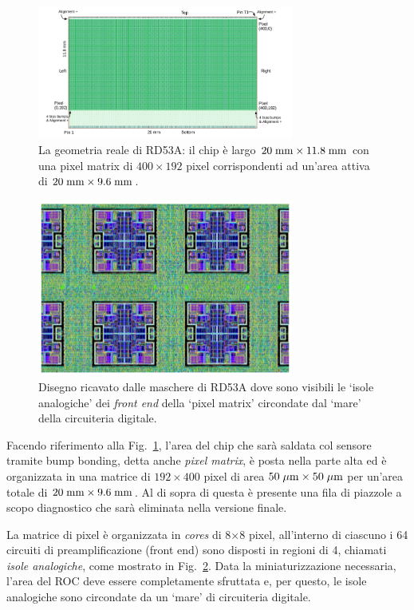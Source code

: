 \begin{figure}
\centering
\includegraphics[width=0.75\textwidth]{Immagini/RD53ALayout}
\caption{La geometria reale di RD53A: il chip è largo $20\rm \; mm \times 11.8\rm \; mm$ con una pixel matrix di $400\times 192$ pixel corrispondenti ad un'area attiva di $20\rm \; mm \times 9.6\rm \; mm$.}
\label{RD53ALayout}
\end{figure}
\begin{figure}
\centering
\includegraphics[width=0.75\textwidth]{Immagini/AnalogIsland}
\caption{Disegno ricavato dalle maschere di RD53A dove sono visibili le `isole analogiche' dei \textit{front end} della `pixel matrix' circondate dal `mare' della circuiteria digitale.}
\label{AnalogIsland}
\end{figure} 
Facendo riferimento alla Fig.~\ref{RD53ALayout}, l'area del chip che sarà saldata col sensore tramite bump bonding, detta anche {\em pixel matrix}, è posta nella parte alta ed è organizzata in una matrice di $192\times400$ pixel di area $50\; \mu \rm m \times 50 \; \mu \rm m$ per un'area totale di $20\rm \; mm \times 9.6\rm \; mm$.
Al di sopra di questa è presente una fila di piazzole a scopo diagnostico che sarà eliminata nella versione finale.

La matrice di pixel è organizzata in \textit{cores} di 8$\times$8 pixel, all'interno di ciascuno i 64 circuiti di preamplificazione (front end) sono disposti in regioni di 4, chiamati {\em isole analogiche}, come mostrato in Fig.~\ref{AnalogIsland}. 
Data la miniaturizzazione necessaria, l'area del ROC deve essere completamente sfruttata e, per questo, le isole analogiche sono circondate da un `mare' di circuiteria digitale. 


